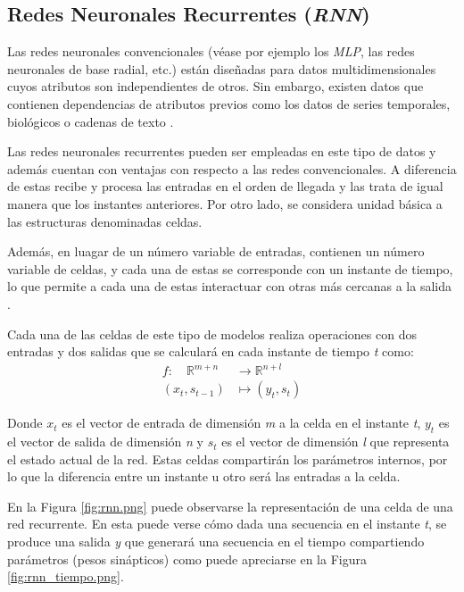 \subsection{Redes Neuronales Recurrentes (\textit{RNN})}
Las redes neuronales convencionales (véase por ejemplo los \textit{MLP}, las redes neuronales de base radial, etc.) están diseñadas para
datos multidimensionales cuyos atributos son independientes de otros.
Sin embargo, existen datos que contienen dependencias de atributos previos como los datos de series temporales, 
biológicos o cadenas de texto \cite{book:aggarwal2018}.

Las redes neuronales recurrentes pueden ser empleadas en este tipo de datos y además cuentan con ventajas con respecto a las redes convencionales.
A diferencia de estas recibe y procesa las entradas en el orden de llegada y las trata de igual manera que los instantes anteriores.
Por otro lado, se considera unidad básica a las estructuras denominadas celdas.

Además, en luagar de un número variable de entradas, contienen un número variable de celdas, y cada una de estas se corresponde con un 
instante de tiempo, lo que permite a cada una de estas interactuar con otras más cercanas a la salida \cite{book:aggarwal2018}.

Cada una de las celdas de este tipo de modelos realiza operaciones con dos entradas y dos salidas que se calculará en cada instante de tiempo \textit{t} como:
\begin{equation}
    \begin{aligned}
    f: \quad \mathbb{R}^{m+n} & \rightarrow \mathbb{R}^{n+l} \\
    \left(x_t, s_{t-1}\right) & \mapsto\left(y_t, s_t\right)
    \end{aligned}
\end{equation}

Donde \(x_t\) es el vector de entrada de dimensión \textit{m} a la celda en el instante \textit{t}, \(y_{t}\) es el vector de salida de 
dimensión \textit{n} y \(s_{t}\) es el vector de dimensión \textit{l} que representa el estado actual de la red.
Estas celdas compartirán los parámetros internos, por lo que la diferencia entre un instante u otro será las entradas a la celda.


En la Figura \ref{fig:rnn.png} puede observarse la representación de una celda de una red recurrente. En
esta puede verse cómo dada una secuencia en el instante \textit{t}, se produce una salida 
\textit{y} que generará una secuencia en el tiempo compartiendo parámetros (pesos sinápticos) como puede apreciarse
en la Figura \ref{fig:rnn_tiempo.png}.

